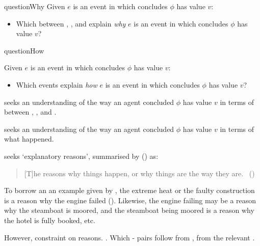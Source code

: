 \begin{note}
\begin{question}{questionWhy}{\qWhy{}}
    Given \(e\) is an event in which \vAgent{} concludes \(\phi\) has value \(v\):
    \begin{itemize}
    \item
      Which \ros{} between , , and  explain \emph{why} \(e\) is an event in which \vAgent{} concludes \(\phi\) has value \(v\)?
    \end{itemize}
    \vspace{-\baselineskip}
  \end{question}

  \begin{question}{questionHow}{\qHow{}}
    \label{q:how}
    \medskip

    Given \(e\) is an event in which \vAgent{} concludes \(\phi\) has value \(v\):
    \begin{itemize}
    \item
      Which events explain \emph{how} \(e\) is an event in which \vAgent{} concludes \(\phi\) has value \(v\)?
    \end{itemize}
    \vspace{-\baselineskip}
  \end{question}
\end{note}

\begin{note}
  \qWhy{} seeks an understanding of the way an agent concluded \(\phi\) has value \(v\) in terms of \ros{} between , , and .

  \qHow{} seeks an understanding of the way an agent concluded \(\phi\) has value \(v\) in terms of what happened.
\end{note}

\begin{note}
  \qWhy{} seeks `explanatory reasons', summarised by \citeauthor{Hieronymi:2011aa} (\citeyear{Hieronymi:2011aa}) as:
  \begin{quote}
    [T]he reasons why things happen, or why things are the way they are.\newline
    \mbox{ }\hfill\mbox{(\citeyear[410]{Hieronymi:2011aa})}
  \end{quote}
  To borrow an an example given by \citeauthor{Hieronymi:2011aa}, the extreme heat or the faulty construction is a reason why the engine failed (\citeyear[409]{Hieronymi:2011aa}).
  Likewise, the engine failing may be a reason why the steamboat is moored, and the steamboat being moored is a reason why the hotel is fully booked, etc.

  However, constraint on reasons.
  .
  Which - pairs follow from , from the relevant \agpe{}.
\end{note}

